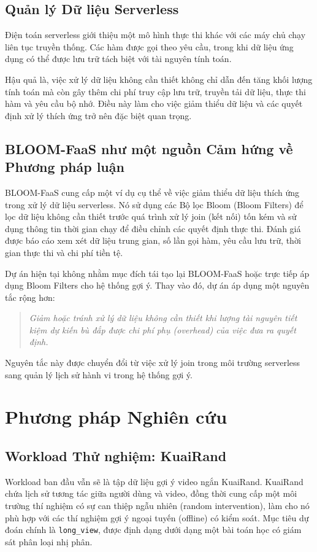 \documentclass[12pt,a4paper]{article}
\begin{document}
\subsection{Quản lý Dữ liệu Serverless}
Điện toán serverless giới thiệu một mô hình thực thi khác với các máy chủ chạy liên tục truyền thống. Các hàm được gọi theo yêu cầu, trong khi dữ liệu ứng dụng có thể được lưu trữ tách biệt với tài nguyên tính toán.

Hậu quả là, việc xử lý dữ liệu không cần thiết không chỉ dẫn đến tăng khối lượng tính toán mà còn gây thêm chi phí truy cập lưu trữ, truyền tải dữ liệu, thực thi hàm và yêu cầu bộ nhớ. Điều này làm cho việc giảm thiểu dữ liệu và các quyết định xử lý thích ứng trở nên đặc biệt quan trọng.

\subsection{BLOOM-FaaS như một nguồn Cảm hứng về Phương pháp luận}
BLOOM-FaaS cung cấp một ví dụ cụ thể về việc giảm thiểu dữ liệu thích ứng trong xử lý dữ liệu serverless. Nó sử dụng các Bộ lọc Bloom (Bloom Filters) để lọc dữ liệu không cần thiết trước quá trình xử lý join (kết nối) tốn kém và sử dụng thông tin thời gian chạy để điều chỉnh các quyết định thực thi. Đánh giá được báo cáo xem xét dữ liệu trung gian, số lần gọi hàm, yêu cầu lưu trữ, thời gian thực thi và chi phí tiền tệ.

Dự án hiện tại không nhằm mục đích tái tạo lại BLOOM-FaaS hoặc trực tiếp áp dụng Bloom Filters cho hệ thống gợi ý. Thay vào đó, dự án áp dụng một nguyên tắc rộng hơn:
\begin{quote}
\textit{Giảm hoặc tránh xử lý dữ liệu không cần thiết khi lượng tài nguyên tiết kiệm dự kiến bù đắp được chi phí phụ (overhead) của việc đưa ra quyết định.}
\end{quote}
Nguyên tắc này được chuyển đổi từ việc xử lý join trong môi trường serverless sang quản lý lịch sử hành vi trong hệ thống gợi ý.

\section{Phương pháp Nghiên cứu}

\subsection{Workload Thử nghiệm: KuaiRand}
Workload ban đầu vẫn sẽ là tập dữ liệu gợi ý video ngắn KuaiRand. KuaiRand chứa lịch sử tương tác giữa người dùng và video, đồng thời cung cấp một môi trường thí nghiệm có sự can thiệp ngẫu nhiên (random intervention), làm cho nó phù hợp với các thí nghiệm gợi ý ngoại tuyến (offline) có kiểm soát. Mục tiêu dự đoán chính là \texttt{long\_view}, được định dạng dưới dạng một bài toán học có giám sát phân loại nhị phân.
\end{document}
